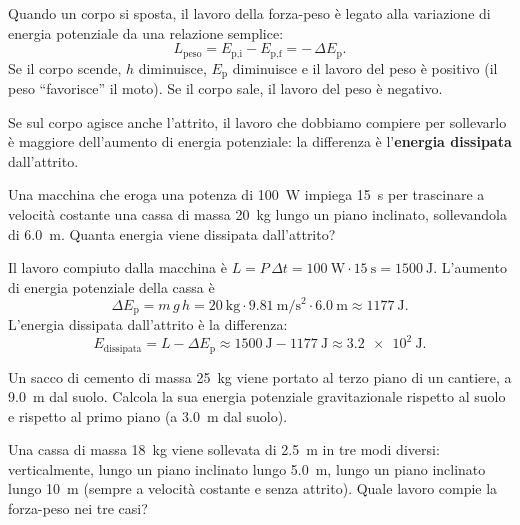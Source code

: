 Quando un corpo si sposta, il lavoro della forza-peso è legato alla variazione di energia potenziale da una relazione semplice:
\[ L_\text{peso} = E_{\text{p,i}} - E_{\text{p,f}} = -\,\Delta E_\text{p}. \]
Se il corpo scende, $h$ diminuisce, $E_\text{p}$ diminuisce e il lavoro del peso è positivo (il peso ``favorisce'' il moto). Se il corpo sale, il lavoro del peso è negativo.

Se sul corpo agisce anche l'attrito, il lavoro che dobbiamo compiere per sollevarlo è maggiore dell'aumento di energia potenziale: la differenza è l'\textbf{energia dissipata} dall'attrito.

\begin{testexample}
Una macchina che eroga una potenza di \SI{100}{\watt} impiega \SI{15}{\second} per trascinare a velocità costante una cassa di massa \SI{20}{\kilo\gram} lungo un piano inclinato, sollevandola di \SI{6,0}{\metre}. Quanta energia viene dissipata dall'attrito?

Il lavoro compiuto dalla macchina è $L = P\,\Delta t = \SI{100}{\watt} \cdot \SI{15}{\second} = \SI{1500}{\joule}$. L'aumento di energia potenziale della cassa è
\[ \Delta E_\text{p} = m\,g\,h = \SI{20}{\kilo\gram} \cdot \SI{9,81}{\metre\per\square\second} \cdot \SI{6,0}{\metre} \approx \SI{1177}{\joule}. \]
L'energia dissipata dall'attrito è la differenza:
\[ E_\text{dissipata} = L - \Delta E_\text{p} \approx \SI{1500}{\joule} - \SI{1177}{\joule} \approx \SI{3,2e2}{\joule}. \]
\end{testexample}

\begin{esercizio}
Un sacco di cemento di massa \SI{25}{\kilo\gram} viene portato al terzo piano di un cantiere, a \SI{9,0}{\metre} dal suolo. Calcola la sua energia potenziale gravitazionale rispetto al suolo e rispetto al primo piano (a \SI{3,0}{\metre} dal suolo).\\
\end{esercizio}

\begin{esercizio}
Una cassa di massa \SI{18}{\kilo\gram} viene sollevata di \SI{2,5}{\metre} in tre modi diversi: verticalmente, lungo un piano inclinato lungo \SI{5,0}{\metre}, lungo un piano inclinato lungo \SI{10}{\metre} (sempre a velocità costante e senza attrito). Quale lavoro compie la forza-peso nei tre casi?\\
\end{esercizio}

